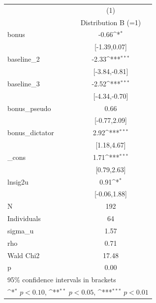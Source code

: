 {
\def\sym#1{\ifmmode^{#1}\else\(^{#1}\)\fi}
\begin{tabular}{l*{1}{c}}
\toprule
            &\multicolumn{1}{c}{(1)}        \\
            &\multicolumn{1}{c}{Distribution B (=1)}\\
\midrule
bonus       &                 -0.66\sym{*}  \\
            &          [-1.39,0.07]         \\
\addlinespace
baseline\_2  &                 -2.33\sym{***}\\
            &         [-3.84,-0.81]         \\
\addlinespace
baseline\_3  &                 -2.52\sym{***}\\
            &         [-4.34,-0.70]         \\
\addlinespace
bonus\_pseudo&                  0.66         \\
            &          [-0.77,2.09]         \\
\addlinespace
bonus\_dictator&                  2.92\sym{***}\\
            &           [1.18,4.67]         \\
\addlinespace
\_cons      &                  1.71\sym{***}\\
            &           [0.79,2.63]         \\
\addlinespace
lnsig2u     &                  0.91\sym{*}  \\
            &          [-0.06,1.88]         \\
\midrule
N           &                   192         \\
Individuals &                    64         \\
sigma\_u     &                  1.57         \\
rho         &                  0.71         \\
Wald Chi2   &                 17.48         \\
p           &                  0.00         \\
\bottomrule
\multicolumn{2}{l}{\footnotesize 95\% confidence intervals in brackets}\\
\multicolumn{2}{l}{\footnotesize \sym{*} \(p<0.10\), \sym{**} \(p<0.05\), \sym{***} \(p<0.01\)}\\
\end{tabular}
}

